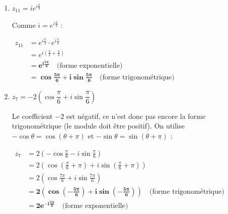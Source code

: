 \documentclass[12pt,a4paper]{article}
\begin{document}
\begin{enumerate}
    $
    \begin{aligned}
        z_{10} &= 2e^{i\pi} \cdot e^{i\frac{\pi}{2}}\\
        &= 2e^{i\left(\pi + \frac{\pi}{2}\right)}\\
        &= 2e^{i\frac{3\pi}{2}}\\
        &= \mathbf{2e^{-i\frac{\pi}{2}}} \quad \text{(forme exponentielle)}\\
        &= \mathbf{2\left(\cos\left(-\frac{\pi}{2}\right) + i\sin\left(-\frac{\pi}{2}\right)\right)} \quad \text{(forme trigonométrique)}
    \end{aligned}
    $

    \item $z_{11} = ie^{i\frac{\pi}{3}}$
    
    Comme $i = e^{i\frac{\pi}{2}}$ :
    
    $
    \begin{aligned}
        z_{11} &= e^{i\frac{\pi}{2}} \cdot e^{i\frac{\pi}{3}}\\
        &= e^{i\left(\frac{\pi}{2} + \frac{\pi}{3}\right)}\\
        &= \mathbf{e^{i\frac{5\pi}{6}}} \quad \text{(forme exponentielle)}\\
        &= \mathbf{\cos\frac{5\pi}{6} + i\sin\frac{5\pi}{6}} \quad \text{(forme trigonométrique)}
    \end{aligned}
    $

    \item $z_7 = -2 \left(\cos \dfrac{\pi}{6} + i \sin \dfrac{\pi}{6}\right)$
    
    Le coefficient $-2$ est négatif, ce n'est donc pas encore la forme trigonométrique (le module doit être positif). On utilise $-\cos\theta = \cos(\theta + \pi)$ et $-\sin\theta = \sin(\theta + \pi)$ :
    
    $
    \begin{aligned}
        z_7 &= 2\left(-\cos\frac{\pi}{6} - i\sin\frac{\pi}{6}\right)\\
        &= 2\left(\cos\left(\frac{\pi}{6} + \pi\right) + i\sin\left(\frac{\pi}{6} + \pi\right)\right)\\
        &= 2\left(\cos\frac{7\pi}{6} + i\sin\frac{7\pi}{6}\right)\\
        &= \mathbf{2\left(\cos\left(-\frac{5\pi}{6}\right) + i\sin\left(-\frac{5\pi}{6}\right)\right)} \quad \text{(forme trigonométrique)}\\
        &= \mathbf{2e^{-i\frac{5\pi}{6}}} \quad \text{(forme exponentielle)}
    \end{aligned}
    $


\end{enumerate}
\end{document}
